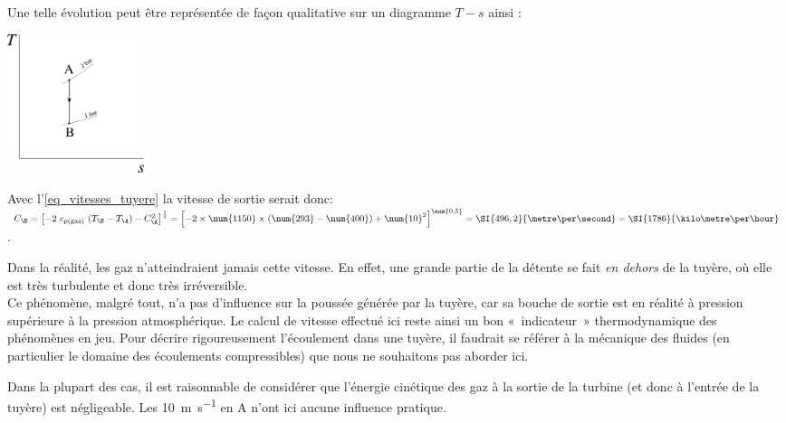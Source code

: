 \begin{anexample}
\begin{answer}
					Une telle évolution peut être représentée de façon qualitative sur un diagramme $T-s$ ainsi :
						\begin{center}\includegraphics[width=4cm]{images/exe_ts_tuyere.png}\end{center}
					Avec l’\cref{eq_vitesses_tuyere} la vitesse de sortie serait donc:\\
					$C_\B = \left[ - 2 \ c_{p \text{(gaz)}} \ (T_\B - T_\A) - C_\A^2 \right]^{\frac{1}{2}}
							= \left[ - 2 \times \num{1150} \times (\num{293} - \num{400}) + \num{10}^2 \right]^{\num{0,5}}
							= \SI{496,2}{\metre\per\second} = \SI{1786}{\kilo\metre\per\hour}$.
								\begin{remark}
									Dans la réalité, les gaz n’atteindraient jamais cette vitesse. En effet, une grande partie de la détente se fait \emph{en dehors} de la tuyère, où elle est très turbulente et donc très irréversible.\\
									Ce phénomène, malgré tout, n’a pas d’influence sur la poussée générée par la tuyère, car sa bouche de sortie est en réalité à pression supérieure à la pression atmosphérique. Le calcul de vitesse effectué ici reste ainsi un bon «~indicateur~» thermodynamique des phénomènes en jeu. Pour décrire rigoureusement l’écoulement dans une tuyère, il faudrait se référer à la mécanique des fluides (en particulier le domaine des écoulements compressibles) que nous ne souhaitons pas aborder ici.
								\end{remark}
								\begin{remark}
									Dans la plupart des cas, il est raisonnable de considérer que l’énergie cinétique des gaz à la sortie de la turbine (et donc à l’entrée de la tuyère) est négligeable. Les \SI{10}{\metre\per\second} en A n’ont ici aucune influence pratique.
								\end{remark}
				\end{answer}
		\end{anexample}

